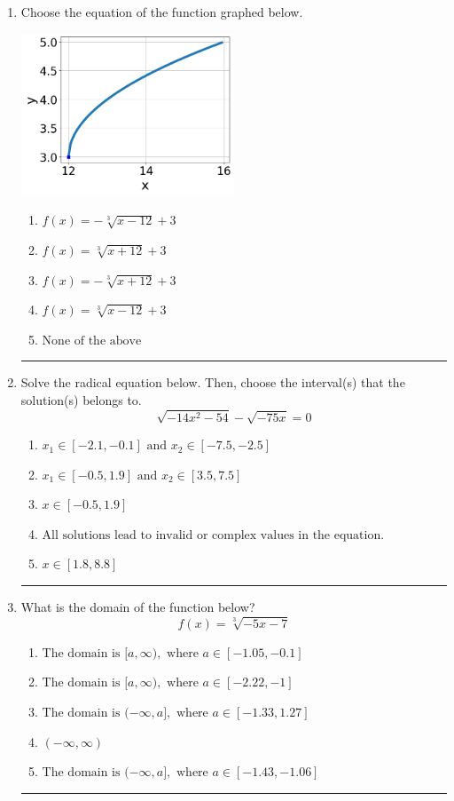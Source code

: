 \documentclass[14pt]{extbook}
\newcommand{\litem}[1]{\item#1\hspace*{-1cm}\rule{\textwidth}{0.4pt}}
\begin{document}
\begin{enumerate}
{\begin{enumerate}[label=\Alph*.]
\end{enumerate} }
\litem{
Choose the equation of the function graphed below.
\begin{center}
    \includegraphics[width=0.5\textwidth]{../Figures/radicalGraphToEquationCopyB.png}
\end{center}
\begin{enumerate}[label=\Alph*.]
\item \( f(x) = - \sqrt[3]{x - 12} + 3 \)
\item \( f(x) = \sqrt[3]{x + 12} + 3 \)
\item \( f(x) = - \sqrt[3]{x + 12} + 3 \)
\item \( f(x) = \sqrt[3]{x - 12} + 3 \)
\item \( \text{None of the above} \)

\end{enumerate} }
\litem{
Solve the radical equation below. Then, choose the interval(s) that the solution(s) belongs to.\[ \sqrt{-14 x^2 - 54} - \sqrt{-75 x} = 0 \]\begin{enumerate}[label=\Alph*.]
\item \( x_1 \in [-2.1, -0.1] \text{ and } x_2 \in [-7.5,-2.5] \)
\item \( x_1 \in [-0.5, 1.9] \text{ and } x_2 \in [3.5,7.5] \)
\item \( x \in [-0.5,1.9] \)
\item \( \text{All solutions lead to invalid or complex values in the equation.} \)
\item \( x \in [1.8,8.8] \)

\end{enumerate} }
\litem{
What is the domain of the function below?\[ f(x) = \sqrt[3]{-5 x - 7} \]\begin{enumerate}[label=\Alph*.]
\item \( \text{The domain is } [a, \infty), \text{   where } a \in [-1.05, -0.1] \)
\item \( \text{The domain is } [a, \infty), \text{   where } a \in [-2.22, -1] \)
\item \( \text{The domain is } (-\infty, a], \text{   where } a \in [-1.33, 1.27] \)
\item \( (-\infty, \infty) \)
\item \( \text{The domain is } (-\infty, a], \text{   where } a \in [-1.43, -1.06] \)


\end{enumerate}}
\end{enumerate}
\end{document}

